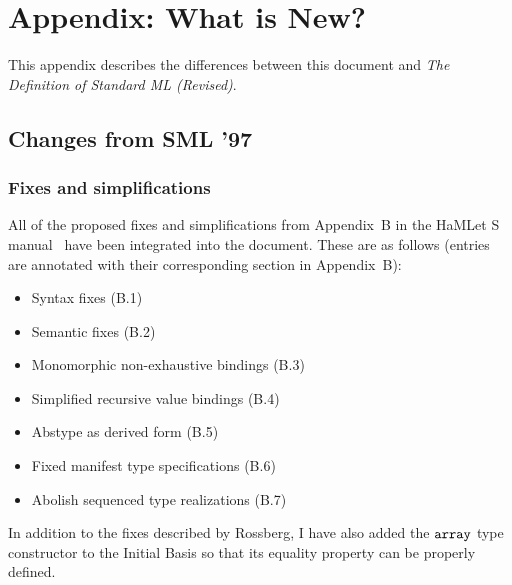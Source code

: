 %

\section{Appendix: What is New?}
\label{whatisnew-app}

This appendix describes the differences between this document and
\emph{The Definition of Standard ML (Revised)}.

\subsection{Changes from SML '97}

\subsubsection{Fixes and simplifications}
All of the proposed fixes and simplifications from Appendix~B in the
HaMLet S manual~\cite{hamlet-s} have been integrated into the document.
These are as follows (entries are annotated with their corresponding
section in Appendix~B):
\begin{itemize}
\setlength{\itemsep}{0em}
\item Syntax fixes (B.1)
\item Semantic fixes (B.2)
\item Monomorphic non-exhaustive bindings (B.3)
\item Simplified recursive value bindings (B.4)
\item Abstype as derived form (B.5)
\item Fixed manifest type specifications (B.6)
\item Abolish sequenced type realizations (B.7)
\end{itemize}%

In addition to the fixes described by Rossberg, I have also added the $\mbox{\tt array}$ type constructor
to the Initial Basis so that its equality property can be properly defined.


